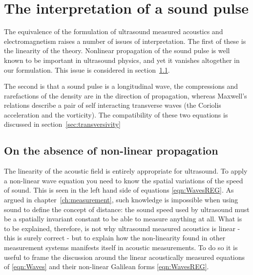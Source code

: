 \documentclass[10pt, fleqn,draft,showtrims,oldfontcommands]{article} %
\newcommand{\secref}[1]{section~\ref{sec:#1}}
\newcommand{\eqnref}[1]{\ref{eqn:#1}}
\newcommand{\chapref}[1]{chapter~\ref{ch:#1}}
\newcommand{\vJ}{\vect J}
\newcommand{\vect}[1]{\mathbf{#1}}
\newcommand{\vu}{\textbf{u}}
\begin{document}

\section{The interpretation of a sound pulse}\label{sec:Interpretations}

The equivalence of the formulation of ultrasound measured acoustics and electromagnetism raises a number of issues of interpretation.
The first of these is the linearity of the theory.
Nonlinear propagation of the sound pulse is well known to be important in ultrasound physics, 
and yet it vanishes altogether in our formulation.
This issue is considered in \secref{NonlinearProp}.

The second is that a sound pulse is a longitudinal wave, the compressions and rarefactions of the density are in the direction of propagation,
whereas Maxwell's relations describe a pair of self interacting transverse waves (the Coriolis acceleration and the vorticity).
The compatibility of these two equations is discussed in \secref{transversivity}

\subsection{On the absence of non-linear propagation} \label{sec:NonlinearProp}

The linearity of the acoustic field is entirely appropriate for ultrasound.
To apply a non-linear wave equation you need to know 
the spatial variations of the speed of sound. 
This is seen in the left hand side of equations \eqnref{WavesREG}.
As argued in \chapref{measurement}, such knowledge is impossible
when using sound to define the concept of distance:
the sound speed used by ultrasound must be a spatially invariant constant to be able to measure anything at all.
What is to be explained, therefore, 
is not why ultrasound measured acoustics is linear - this is surely correct - 
but to explain how the non-linearity found in other measurement systems  manifests itself in acoustic measurements.
To do so it is useful to frame the discussion around the linear acoustically measured equations of
\eqnref{Waves}
and their non-linear Galilean forms \eqnref{WavesREG}.
\end{document}

